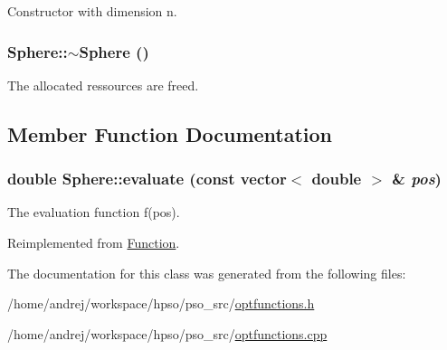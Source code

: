 Constructor with dimension n. 

\hypertarget{classSphere_569c071e50a3e11f678630ee1a17737e}{
\subsubsection{\setlength{\rightskip}{0pt plus 5cm}Sphere::$\sim$Sphere ()}}
\label{classSphere_569c071e50a3e11f678630ee1a17737e}


The allocated ressources are freed. 



\subsection{Member Function Documentation}
\hypertarget{classSphere_e4d2bfab43d39524dfe3421d76d66f5f}{
\subsubsection{\setlength{\rightskip}{0pt plus 5cm}double Sphere::evaluate (const vector$<$ double $>$ \& {\em pos})}}
\label{classSphere_e4d2bfab43d39524dfe3421d76d66f5f}


The evaluation function f(pos). 



Reimplemented from \hyperlink{classFunction_159260a1fc3afa8932491e4057b6b844}{Function}.

The documentation for this class was generated from the following files:\begin{CompactItemize}
\item 
/home/andrej/workspace/hpso/pso\_\-src/\hyperlink{optfunctions_8h}{optfunctions.h}\item 
/home/andrej/workspace/hpso/pso\_\-src/\hyperlink{optfunctions_8cpp}{optfunctions.cpp}\end{CompactItemize}
